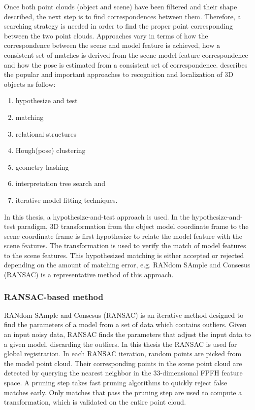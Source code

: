 Once both point clouds (object and scene) have been filtered and their shape described, the next step is to find correspondences between them. Therefore, a searching strategy is needed in order to find the proper point corresponding between the two point clouds. Approaches vary in terms of how the correspondence between the scene and model feature is achieved, how a consistent set of matches is derived from the scene-model feature correspondence and how the pose is estimated from a consistent set of correspondence. \cite{repMatching} describes the popular and important approaches to recognition and localization of 3D objects as follow: 
\begin{enumerate}
    \item hypothesize and test
    \item matching
    \item relational structures
    \item Hough(pose) clustering
    \item geometry hashing
    \item interpretation tree search and
    \item iterative model fitting techniques.
\end{enumerate}

In this thesis, a hypothesize-and-test approach is used. In the hypothesize-and-test paradigm, 3D transformation from the object model coordinate frame to the scene coordinate frame is first hypothesize to relate the model feature with the scene features. The transformation is used to verify the match of model features to the scene features. This hypothesized matching is either accepted or rejected depending on the amount of matching error, e.g.  RANdom SAmple and Consesus (RANSAC) is a representative method of this approach.

\subsubsection{RANSAC-based method} \label{sssec:num1}

RANdom SAmple and Consesus (RANSAC)\cite{repMatching} is an iterative method designed to find the parameters of a model from a set of data which contains outliers. Given an input noisy data, RANSAC finds the parameters that adjust the input data to a given model, discarding the outliers. In this thesis the RANSAC is used for global registration. In each RANSAC iteration, random points are picked from the model point cloud. Their corresponding points in the scene point cloud are detected by querying the nearest neighbor in the 33-dimensional FPFH feature space. A pruning step takes fast pruning algorithms to quickly reject false matches early. Only matches that pass the pruning step are used to compute a transformation, which is validated on the entire point cloud. 

